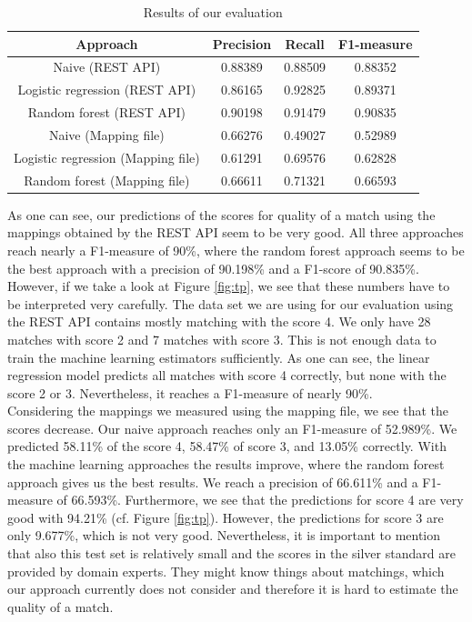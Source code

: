 \documentclass[runningheads]{llncs}
\begin{document}
\begin{table}[H]
\centering
\caption{Results of our evaluation}\label{res}
\begin{tabular}{|c|c|c|c|}
\hline
    \textbf{Approach}&
    \textbf{Precision}&
    \textbf{Recall}&
    \textbf{F1-measure}\\
    \hline
    Naive (REST API) & 0.88389 & 0.88509 & 0.88352 \\
    \hline
    Logistic regression (REST API) & 0.86165 & 0.92825 & 0.89371 \\
    \hline
    Random forest (REST API) & 0.90198 & 0.91479 & 0.90835 \\
    \hline
    Naive (Mapping file) & 0.66276 & 0.49027 & 0.52989 \\
    \hline
    Logistic regression (Mapping file) & 0.61291 & 0.69576 & 0.62828 \\
    \hline
    Random forest (Mapping file) & 0.66611 & 0.71321 & 0.66593 \\
    \hline

\end{tabular}
\end{table}

As one can see, our predictions of the scores for quality of a match using the mappings obtained by the REST API seem to be very good. All three approaches reach nearly a F1-measure of 90\%, where the random forest approach seems to be the best approach with a precision of 90.198\% and a F1-score of 90.835\%. However, if we take a look at Figure \ref{fig:tp}, we see that these numbers have to be interpreted very carefully. The data set we are using for our evaluation using the REST API contains mostly matching with the score 4. We only have 28 matches with score 2 and 7 matches with score 3. This is not enough data to train the machine learning estimators sufficiently. As one can see, the linear regression model predicts all matches with score 4 correctly, but none with the score 2 or 3. Nevertheless, it reaches a F1-measure of nearly 90\%.\\

    
Considering the mappings we measured using the mapping file, we see that the scores decrease. Our naive approach reaches only an F1-measure of 52.989\%. We predicted 58.11\% of the score 4, 58.47\% of score 3, and 13.05\% correctly. With the machine learning approaches the results improve, where the random forest approach gives us the best results. We reach a precision of 66.611\% and a F1-measure of 66.593\%. Furthermore, we see that the predictions for score 4 are very good with 94.21\% (cf. Figure \ref{fig:tp}). However, the predictions for score 3 are only 9.677\%, which is not very good.
Nevertheless, it is important to mention that also this test set is relatively small and the scores in the silver standard are provided by domain experts. They might know things about matchings, which our approach currently does not consider and therefore it is hard to estimate the quality of a match.
 
\end{document}
